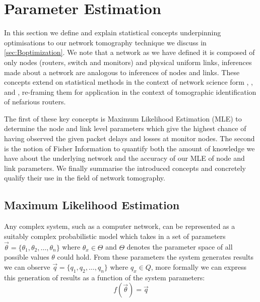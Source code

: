 \section{Parameter Estimation}
\label{sec:Bparameterestimation}

In this section we define and explain statistical concepts underpinning optimisations to our network tomography technique we discuss in \cref{sec:Boptimization}. We note that a network as we have defined it is composed of only nodes (routers, switch and monitors) and physical uniform links, inferences made about a network are analogous to inferences of nodes and links. These concepts extend on statistical methods in the context of network science form \cite{meng_method_2016}, \cite{he_fisher_2015}, and \cite{he_network_2021}, re-framing them for application in the context of tomographic identification of nefarious routers.\par
The first of these key concepts is Maximum Likelihood Estimation (MLE) to determine the node and link level parameters which give the highest chance of having observed the given packet delays and losses at monitor nodes. The second is the notion of Fisher Information to quantify both the amount of knowledge we have about the underlying network and the accuracy of our MLE of node and link parameters. We finally summarise the introduced concepts and concretely qualify their use in the field of network tomography.

\subsection{Maximum Likelihood Estimation}
\label{ssec:Bmle}

Any complex system, such as a computer network, can be represented as a suitably complex probabilistic model which takes in a set of parameters $\vec{\theta} = \{\theta_1, \theta_2,\ldots,\theta_n\}$ where $\theta_x \in \Theta$ and $\Theta$ denotes the parameter space of all possible values $\theta$ could hold. From these parameters the system generates results we can observe $\vec{q} = \{q_1,q_2,\ldots,q_n\}$ where $q_x \in Q$, more formally we can express this generation of results as a function of the system parameters: \[f(\vec{\theta}) = \vec{q}\]

